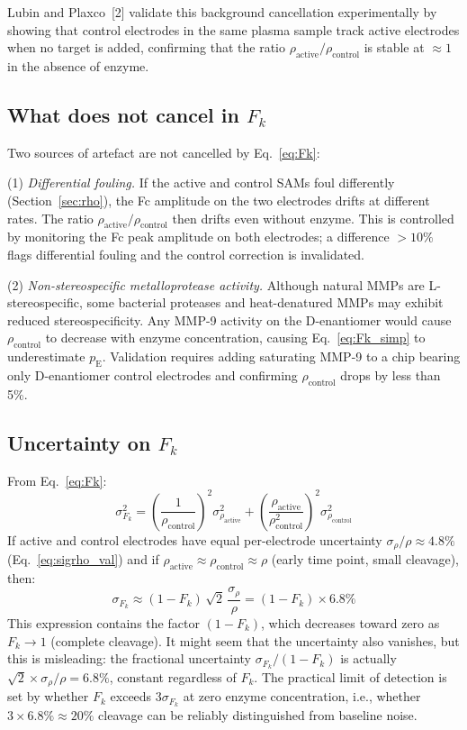 \documentclass[10pt,a4paper]{article}
\numberwithin{equation}{section}
\newcommand{\cit}[1]{[#1]}
\newcommand{\Fk}{F_k}
\begin{document}
Lubin and Plaxco~\cit{2} validate this background cancellation experimentally
by showing that control electrodes in the same plasma sample track active
electrodes when no target is added, confirming that the ratio
$\rho_\text{active}/\rho_\text{control}$ is stable at $\approx 1$ in
the absence of enzyme.

\subsection{What does not cancel in $F_k$}

Two sources of artefact are not cancelled by Eq.~\eqref{eq:Fk}:

(1) \emph{Differential fouling.} If the active and control SAMs foul
differently (Section~\ref{sec:rho}), the Fc amplitude on the two electrodes
drifts at different rates. The ratio $\rho_\text{active}/\rho_\text{control}$
then drifts even without enzyme. This is controlled by monitoring the Fc
peak amplitude on both electrodes; a difference $>10\%$ flags differential
fouling and the control correction is invalidated.

(2) \emph{Non-stereospecific metalloprotease activity.} Although natural
MMPs are L-stereospecific, some bacterial proteases and heat-denatured
MMPs may exhibit reduced stereospecificity. Any MMP-9 activity on the
D-enantiomer would cause $\rho_\text{control}$ to decrease with enzyme
concentration, causing Eq.~\eqref{eq:Fk_simp} to underestimate $p_\text{E}$.
Validation requires adding saturating MMP-9 to a chip bearing only
D-enantiomer control electrodes and confirming $\rho_\text{control}$
drops by less than 5\%.

\subsection{Uncertainty on $F_k$}

From Eq.~\eqref{eq:Fk}:
\begin{equation}
  \sigma_{\Fk}^2 = \left(\frac{1}{\rho_\text{control}}\right)^2 \sigma_{\rho_\text{active}}^2
  + \left(\frac{\rho_\text{active}}{\rho_\text{control}^2}\right)^2 \sigma_{\rho_\text{control}}^2
  \label{eq:sigFk_raw}
\end{equation}
If active and control electrodes have equal per-electrode uncertainty
$\sigma_\rho / \rho \approx 4.8\%$ (Eq.~\ref{eq:sigrho_val}) and if
$\rho_\text{active} \approx \rho_\text{control} \approx \rho$ (early time point,
small cleavage), then:
\begin{equation}
  \sigma_{\Fk} \approx (1 - \Fk)\,\sqrt{2}\,
  \frac{\sigma_\rho}{\rho}
  = (1 - \Fk) \times 6.8\%
  \label{eq:sigFk}
\end{equation}
This expression contains the factor $(1-\Fk)$, which decreases toward zero
as $\Fk \to 1$ (complete cleavage). It might seem that the uncertainty also
vanishes, but this is misleading: the fractional uncertainty $\sigma_{\Fk} /
(1 - \Fk)$ is actually $\sqrt{2} \times \sigma_\rho/\rho = 6.8\%$,
constant regardless of $\Fk$. The practical limit of detection is set by
whether $\Fk$ exceeds $3\sigma_{\Fk}$ at zero enzyme concentration, i.e.,
whether $3 \times 6.8\% \approx 20\%$ cleavage can be reliably distinguished
from baseline noise.
\end{document}
